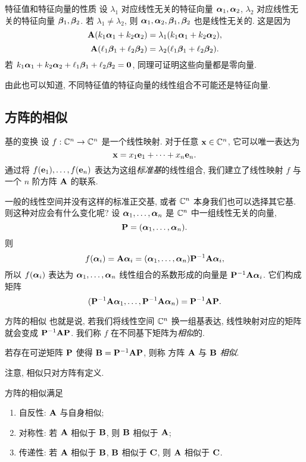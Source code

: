 \begin{frame}{特征值和特征向量的性质}
	\onslide<+->
	设 $\lambda_1$ 对应线性无关的特征向量 $\bma_1,\bma_2$,
	$\lambda_2$ 对应线性无关的特征向量 $\bmb_1,\bmb_2$.
	\onslide<+->
	若 $\lambda_1\neq \lambda_2$, 则 $\bma_1,\bma_2,\bmb_1,\bmb_2$ 也是线性无关的.
	\onslide<+->
	这是因为
	\[\bfA(k_1\bma_1+k_2\bma_2)=\lambda_1(k_1\bma_1+k_2\bma_2),\]
	\[\bfA(\ell_1\bmb_1+\ell_2\bmb_2)=\lambda_2(\ell_1\bmb_1+\ell_2\bmb_2).\]
	\onslide<+->
	若 $k_1\bma_1+k_2\bma_2+\ell_1\bmb_1+\ell_2\bmb_2={\bf0}$,
	同理可证明这些向量都是零向量.
	
	\onslide<+->
	由此也可以知道, 不同特征值的特征向量的线性组合不可能还是特征向量.
\end{frame}


\subsection{方阵的相似}

\begin{frame}{基的变换}
	\onslide<+->
	设 $f:\BC^n\to \BC^n$ 是一个线性映射.
	\onslide<+->
	对于任意 $\bfx\in \BC^n$, 它可以唯一表达为
	\[\bfx=x_1\bfe_1+\cdots+x_n\bfe_n.\]
	\onslide<+->
	通过将 $f(\bfe_1),\dots,f(\bfe_n)$ 表达为这组\emph{标准基}的线性组合, 我们建立了线性映射 $f$ 与一个 $n$ 阶方阵 $\bfA$ 的联系.

	\onslide<+->
	一般的线性空间并没有这样的标准正交基, 或者 $\BC^n$ 本身我们也可以选择其它基.
	\onslide<+->
	则这种对应会有什么变化呢?
	\onslide<+->
	设 $\bma_1,\dots,\bma_n$ 是 $\BC^n$ 中一组线性无关的向量, 
	\[\bfP=(\bma_1,\dots,\bma_n).\]
	\onslide<+->
	则
	\[f(\bma_i)=\bfA\bma_i=(\bma_1,\dots,\bma_n)\bfP^{-1}\bfA\bma_i,\]
	所以 $f(\bma_i)$ 表达为 $\bma_1,\dots,\bma_n$ 线性组合的系数形成的向量是 $\bfP^{-1}\bfA\bma_i$.
	\onslide<+->
	它们构成矩阵
	\[(\bfP^{-1}\bfA\bma_1,\dots,\bfP^{-1}\bfA\bma_n)=\bfP^{-1}\bfA\bfP.\]
\end{frame}


\begin{frame}{方阵的相似}
	\onslide<+->
	也就是说, 若我们将线性空间 $\BC^n$ 换一组基表达, 线性映射对应的矩阵就会变成 $\bfP^{-1}\bfA\bfP$.
	\onslide<+->
	我们称 $f$ 在不同基下矩阵为\emph{相似}的.
	\onslide<+->
	\begin{definition}
		若存在可逆矩阵 $\bfP$ 使得 $\bfB=\bfP^{-1}\bfA\bfP$, 则称 方阵 $\bfA$ 与 $\bfB$ \emph{相似}.
	\end{definition}
	\onslide<+->
	注意, 相似只对方阵有定义.
	\onslide<+->
	\begin{proposition}
		方阵的相似满足
		\begin{enumerate}
			\item 自反性: $\bfA$ 与自身相似;
			\item 对称性: 若 $\bfA$ 相似于 $\bfB$, 则 $\bfB$ 相似于 $\bfA$;
			\item 传递性: 若 $\bfA$ 相似于 $\bfB$, $\bfB$ 相似于 $\bfC$, 则 $\bfA$ 相似于 $\bfC$.
		\end{enumerate}
	\end{proposition}
\end{frame}



